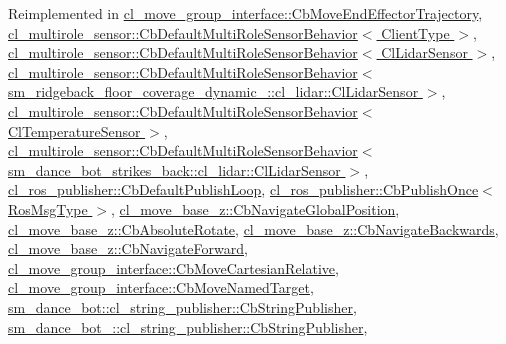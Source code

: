 Reimplemented in \hyperlink{classcl__move__group__interface_1_1CbMoveEndEffectorTrajectory_a4952c092e69bc6e9831568de32888da5}{cl\+\_\+move\+\_\+group\+\_\+interface\+::\+Cb\+Move\+End\+Effector\+Trajectory}, \hyperlink{classcl__multirole__sensor_1_1CbDefaultMultiRoleSensorBehavior_a0f400c7e29d0cb1dda11242a5a922f4c}{cl\+\_\+multirole\+\_\+sensor\+::\+Cb\+Default\+Multi\+Role\+Sensor\+Behavior$<$ Client\+Type $>$}, \hyperlink{classcl__multirole__sensor_1_1CbDefaultMultiRoleSensorBehavior_a0f400c7e29d0cb1dda11242a5a922f4c}{cl\+\_\+multirole\+\_\+sensor\+::\+Cb\+Default\+Multi\+Role\+Sensor\+Behavior$<$ Cl\+Lidar\+Sensor $>$}, \hyperlink{classcl__multirole__sensor_1_1CbDefaultMultiRoleSensorBehavior_a0f400c7e29d0cb1dda11242a5a922f4c}{cl\+\_\+multirole\+\_\+sensor\+::\+Cb\+Default\+Multi\+Role\+Sensor\+Behavior$<$ sm\+\_\+ridgeback\+\_\+floor\+\_\+coverage\+\_\+dynamic\+\_\+::cl\+\_\+lidar\+::\+Cl\+Lidar\+Sensor $>$}, \hyperlink{classcl__multirole__sensor_1_1CbDefaultMultiRoleSensorBehavior_a0f400c7e29d0cb1dda11242a5a922f4c}{cl\+\_\+multirole\+\_\+sensor\+::\+Cb\+Default\+Multi\+Role\+Sensor\+Behavior$<$ Cl\+Temperature\+Sensor $>$}, \hyperlink{classcl__multirole__sensor_1_1CbDefaultMultiRoleSensorBehavior_a0f400c7e29d0cb1dda11242a5a922f4c}{cl\+\_\+multirole\+\_\+sensor\+::\+Cb\+Default\+Multi\+Role\+Sensor\+Behavior$<$ sm\+\_\+dance\+\_\+bot\+\_\+strikes\+\_\+back\+::cl\+\_\+lidar\+::\+Cl\+Lidar\+Sensor $>$}, \hyperlink{classcl__ros__publisher_1_1CbDefaultPublishLoop_a206c6bc09e7c6414304b679ec415c19f}{cl\+\_\+ros\+\_\+publisher\+::\+Cb\+Default\+Publish\+Loop}, \hyperlink{classcl__ros__publisher_1_1CbPublishOnce_ad82cb7d6ac69fe9b91bc955550ab92cb}{cl\+\_\+ros\+\_\+publisher\+::\+Cb\+Publish\+Once$<$ Ros\+Msg\+Type $>$}, \hyperlink{classcl__move__base__z_1_1CbNavigateGlobalPosition_a5c18268af1e7fc236aa155a58345d5d7}{cl\+\_\+move\+\_\+base\+\_\+z\+::\+Cb\+Navigate\+Global\+Position}, \hyperlink{classcl__move__base__z_1_1CbAbsoluteRotate_a0e362b8e9f0d7de5aeee183ba4031437}{cl\+\_\+move\+\_\+base\+\_\+z\+::\+Cb\+Absolute\+Rotate}, \hyperlink{classcl__move__base__z_1_1CbNavigateBackwards_a92858e20e6401051203f5dfa4aef60dc}{cl\+\_\+move\+\_\+base\+\_\+z\+::\+Cb\+Navigate\+Backwards}, \hyperlink{classcl__move__base__z_1_1CbNavigateForward_a2160484562ef5fb1c655fab7f990241e}{cl\+\_\+move\+\_\+base\+\_\+z\+::\+Cb\+Navigate\+Forward}, \hyperlink{classcl__move__group__interface_1_1CbMoveCartesianRelative_a4ec79f1b62ddd8ecabf1f63aabb69013}{cl\+\_\+move\+\_\+group\+\_\+interface\+::\+Cb\+Move\+Cartesian\+Relative}, \hyperlink{classcl__move__group__interface_1_1CbMoveNamedTarget_ae7e89742c903577b71790370714047d8}{cl\+\_\+move\+\_\+group\+\_\+interface\+::\+Cb\+Move\+Named\+Target}, \hyperlink{classsm__dance__bot_1_1cl__string__publisher_1_1CbStringPublisher_ac93cc1eb150140331cb3e560ec8249e2}{sm\+\_\+dance\+\_\+bot\+::cl\+\_\+string\+\_\+publisher\+::\+Cb\+String\+Publisher}, \hyperlink{classsm__dance__bot__2_1_1cl__string__publisher_1_1CbStringPublisher_aee990acdb5ec33f1d22efafbe32216f2}{sm\+\_\+dance\+\_\+bot\+\_\+::cl\+\_\+string\+\_\+publisher\+::\+Cb\+String\+Publisher}, 
